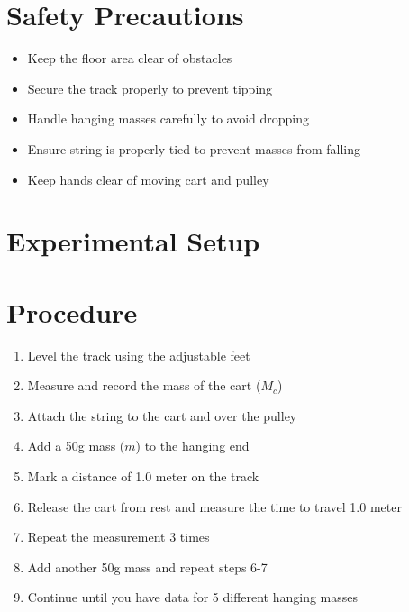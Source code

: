 \documentclass[12pt]{article}
\begin{document}
\section*{Safety Precautions}
\begin{tcolorbox}[colback=safetyyellow!30,colframe=safetyyellow!80,title=\textbf{Safety First!}]
\begin{itemize}
\item Keep the floor area clear of obstacles
\item Secure the track properly to prevent tipping
\item Handle hanging masses carefully to avoid dropping
\item Ensure string is properly tied to prevent masses from falling
\item Keep hands clear of moving cart and pulley
\end{itemize}
\end{tcolorbox}

\section*{Experimental Setup}
\begin{center}
\end{center}

\section*{Procedure}
\begin{enumerate}[label=\arabic*.]
\item Level the track using the adjustable feet
\item Measure and record the mass of the cart ($M_c$)
\item Attach the string to the cart and over the pulley
\item Add a 50g mass ($m$) to the hanging end
\item Mark a distance of 1.0 meter on the track
\item Release the cart from rest and measure the time to travel 1.0 meter
\item Repeat the measurement 3 times
\item Add another 50g mass and repeat steps 6-7
\item Continue until you have data for 5 different hanging masses
\end{enumerate}
\end{document}

